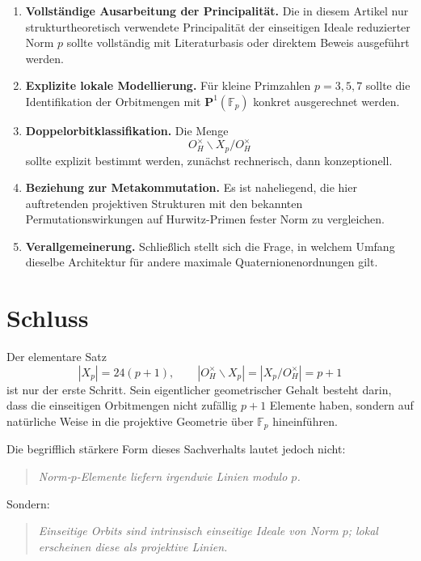 \documentclass[12pt,a4paper]{article}
\theoremstyle{definition}
\newcommand{\OH}{O_H}
\newcommand{\Fp}{\mathbb{F}_p}
\begin{document}
	\begin{enumerate}[label=\arabic*.]
		\item \textbf{Vollständige Ausarbeitung der Principalität.}  
		Die in diesem Artikel nur strukturtheoretisch verwendete Principalität der einseitigen Ideale reduzierter Norm \(p\) sollte vollständig mit Literaturbasis oder direktem Beweis ausgeführt werden.
		
		\item \textbf{Explizite lokale Modellierung.}  
		Für kleine Primzahlen \(p=3,5,7\) sollte die Identifikation der Orbitmengen mit \(\mathbf P^1(\Fp)\) konkret ausgerechnet werden.
		
		\item \textbf{Doppelorbitklassifikation.}  
		Die Menge
		\[
		\OH^\times\backslash X_p/\OH^\times
		\]
		sollte explizit bestimmt werden, zunächst rechnerisch, dann konzeptionell.
		
		\item \textbf{Beziehung zur Metakommutation.}  
		Es ist naheliegend, die hier auftretenden projektiven Strukturen mit den bekannten Permutationswirkungen auf Hurwitz-Primen fester Norm zu vergleichen.
		
		\item \textbf{Verallgemeinerung.}  
		Schließlich stellt sich die Frage, in welchem Umfang dieselbe Architektur für andere maximale Quaternionenordnungen gilt.
	\end{enumerate}
	
	\section{Schluss}
	
	Der elementare Satz
	\[
	|X_p|=24(p+1),
	\qquad
	|\OH^\times\backslash X_p|=|X_p/\OH^\times|=p+1
	\]
	ist nur der erste Schritt. Sein eigentlicher geometrischer Gehalt besteht darin, dass die einseitigen Orbitmengen nicht zufällig \(p+1\) Elemente haben, sondern auf natürliche Weise in die projektive Geometrie über \(\Fp\) hineinführen.
	
	Die begrifflich stärkere Form dieses Sachverhalts lautet jedoch nicht:
	\begin{quote}
		\emph{Norm-\(p\)-Elemente liefern irgendwie Linien modulo \(p\).}
	\end{quote}
	Sondern:
	\begin{quote}
		\emph{Einseitige Orbits sind intrinsisch einseitige Ideale von Norm \(p\); lokal erscheinen diese als projektive Linien.}
	\end{quote}
	
\end{document}
